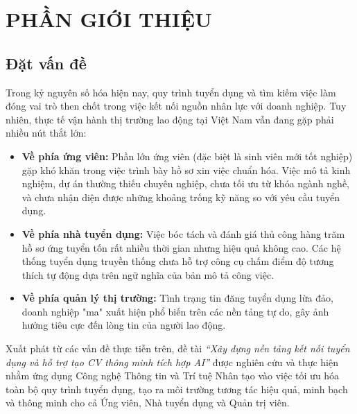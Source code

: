 
\newpage

\begingroup
\section*{PHẦN GIỚI THIỆU}

\setcounter{subsection}{0}
\renewcommand{\thesubsection}{\arabic{subsection}.} %

\subsection{Đặt vấn đề}
Trong kỷ nguyên số hóa hiện nay, quy trình tuyển dụng và tìm kiếm việc làm đóng vai trò then chốt trong việc kết nối nguồn nhân lực với doanh nghiệp. Tuy nhiên, thực tế vận hành thị trường lao động tại Việt Nam vẫn đang gặp phải nhiều nút thắt lớn:
\begin{itemize}
    \item \textbf{Về phía ứng viên:} Phần lớn ứng viên (đặc biệt là sinh viên mới tốt nghiệp) gặp khó khăn trong việc trình bày hồ sơ xin việc chuẩn hóa. Việc mô tả kinh nghiệm, dự án thường thiếu chuyên nghiệp, chưa tối ưu từ khóa ngành nghề, và chưa nhận diện được những khoảng trống kỹ năng so với yêu cầu tuyển dụng.
    \item \textbf{Về phía nhà tuyển dụng:} Việc bóc tách và đánh giá thủ công hàng trăm hồ sơ ứng tuyển tốn rất nhiều thời gian nhưng hiệu quả không cao. Các hệ thống tuyển dụng truyền thống chưa hỗ trợ công cụ chấm điểm độ tương thích tự động dựa trên ngữ nghĩa của bản mô tả công việc.
    \item \textbf{Về phía quản lý thị trường:} Tình trạng tin đăng tuyển dụng lừa đảo, doanh nghiệp "ma" xuất hiện phổ biến trên các nền tảng tự do, gây ảnh hưởng tiêu cực đến lòng tin của người lao động.
\end{itemize}

Xuất phát từ các vấn đề thực tiễn trên, đề tài \textit{“Xây dựng nền tảng kết nối tuyển dụng và hỗ trợ tạo CV thông minh tích hợp AI”} được nghiên cứu và thực hiện nhằm ứng dụng Công nghệ Thông tin và Trí tuệ Nhân tạo vào việc tối ưu hóa toàn bộ quy trình tuyển dụng, tạo ra môi trường tương tác hiệu quả, minh bạch và thông minh cho cả Ứng viên, Nhà tuyển dụng và Quản trị viên.

